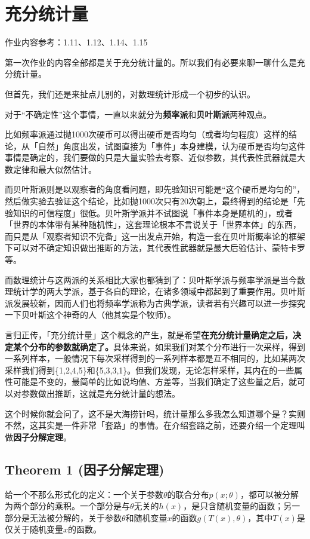 \documentclass[10pt, a4paper]{article}
\begin{document}
\section{充分统计量}
作业内容参考：1.11、1.12、1.14、1.15\par
第一次作业的内容全部都是关于充分统计量的。所以我们有必要来聊一聊什么是充分统计量。\par
但首先，我们还是来扯点儿别的，对数理统计形成一个初步的认识。\par 对于“不确定性”这个事情，一直以来就分为\textbf{频率派}和\textbf{贝叶斯派}两种观点。\par 比如频率派通过抛1000次硬币可以得出硬币是否均匀（或者均匀程度）这样的结论，从「自然」角度出发，试图直接为「事件」本身建模，认为硬币是否均匀这件事情是确定的，我们要做的只是大量实验去考察、近似参数，其代表性武器就是大数定律和最大似然估计。\par
而贝叶斯派则是以观察者的角度看问题，即先验知识可能是“这个硬币是均匀的”，然后做实验去验证这个结论，比如抛1000次只有20次朝上，最终得到的结论是「先验知识的可信程度」很低。贝叶斯学派并不试图说「事件本身是随机的」，或者「世界的本体带有某种随机性」，这套理论根本不言说关于「世界本体」的东西，而只是从「观察者知识不完备」这一出发点开始，构造一套在贝叶斯概率论的框架下可以对不确定知识做出推断的方法，其代表性武器就是最大后验估计、蒙特卡罗等。\par
而数理统计与这两派的关系相比大家也都猜到了：贝叶斯学派与频率学派是当今数理统计学的两大学派，基于各自的理论，在诸多领域中都起到了重要作用。贝叶斯派发展较新，因而人们也将频率学派称为古典学派，读者若有兴趣可以进一步探究一下贝叶斯这个神奇的人（他其实是个牧师）。\\\par
言归正传，「充分统计量」这个概念的产生，就是希望\textbf{在充分统计量确定之后，决定某个分布的参数就确定了。}具体来说，如果我们对某个分布进行一次采样，得到一系列样本，一般情况下每次采样得到的一系列样本都是互不相同的，比如某两次采样我们得到\{1,2,4,5\}和\{5,3,3,1\}。但我们发现，无论怎样采样，其内在的一些属性可能是不变的，最简单的比如说均值、方差等，当我们确定了这些量之后，就可以对参数做出推断，这就是充分统计量的想法。\par
这个时候你就会问了，这不是大海捞针吗，统计量那么多我怎么知道哪个是？实则不然，这其实是一件非常「套路」的事情。在介绍套路之前，还要介绍一个定理叫做\textbf{因子分解定理}。

\subsection*{Theorem 1 (因子分解定理)}
给一个不那么形式化的定义：一个关于参数$\theta$的联合分布$p(x;\theta)$，都可以被分解为两个部分的乘积。一个部分是与$\theta$无关的$h(x)$，是只含随机变量的函数；另一部分是无法被分解的，关于参数$\theta$和随机变量$x$的函数$g(T(x),\theta)$，其中$T(x)$是仅关于随机变量$x$的函数。\\\par
\end{document}
